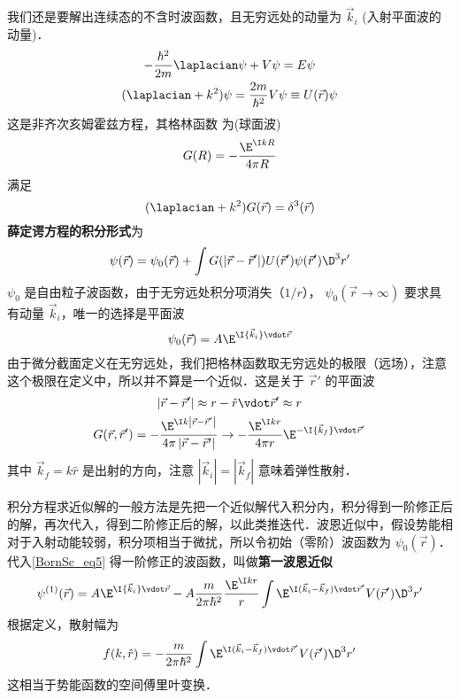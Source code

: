 
我们还是要解出连续态的不含时波函数，且无穷远处的动量为 $\vec k_i$ (入射平面波的动量)．
\begin{gather}
- \frac{{{\hbar ^2}}}{{2m}}{\laplacian}\psi  + V\psi  = E\psi \\
({\laplacian} + {k^2})\psi  = \frac{{2m}}{{{\hbar ^2}}}V\psi  \equiv U(\vec r)\psi
\end{gather}
这是非齐次亥姆霍兹方程，其格林函数%
为(球面波)
\begin{equation}
G(R) =  - \frac{{{\E^{\I kR}}}}{{4\pi R}}
\end{equation}
满足
\begin{equation}
({\laplacian} + {k^2})G(\vec r) = {\delta ^3}(\vec r)
\end{equation}
\textbf{薛定谔方程的积分形式}为
\begin{equation}\label{BornSc_eq5}
\psi (\vec r) = {\psi _0}(\vec r) + \int {G(\left| {\vec r - \vec r'} \right|)U(\vec r')\psi (\vec r'){\D ^3}r'} 
\end{equation}
$\psi_0$ 是自由粒子波函数，由于无穷远处积分项消失（$1/r$）， $\psi_0(\vec r\to\infty)$ 要求具有动量 $\vec k_i$，唯一的选择是平面波
 \begin{equation}
{\psi _0}(\vec r) = A{\E^{\I{{\vec k}_i} \vdot \vec r}}
\end{equation}
由于微分截面定义在无穷远处，我们把格林函数取无穷远处的极限（远场），注意这个极限在定义中，所以并不算是一个近似．这是关于 $\vec r'$ 的平面波
\begin{gather}
\left| {\vec r - \vec r'} \right| \approx r - \hat r \vdot \vec r' \approx r\\
G(\vec r,\vec r') =  - \frac{{{\E^{\I k\left| {\vec r - \vec r'} \right|}}}}{{4\pi \left| {\vec r - \vec r'} \right|}} \to  - \frac{{{\E^{\I kr}}}}{{4\pi r}}{\E^{ -\I {{\vec k}_f} \vdot \vec r'}}
\end{gather}
其中 ${\vec k_f} = k\hat r$ 是出射的方向，注意 $\left| {{{\vec k}_i}} \right| = \left| {{{\vec k}_f}} \right|$ 意味着弹性散射．

积分方程求近似解的一般方法是先把一个近似解代入积分内，积分得到一阶修正后的解，再次代入，得到二阶修正后的解，以此类推迭代．波恩近似中，假设势能相对于入射动能较弱，积分项相当于微扰，所以令初始（零阶）波函数为 $\psi_0(\vec r)$．代入\autoref{BornSc_eq5} 得一阶修正的波函数，叫做\textbf{第一波恩近似}
\begin{equation}
{\psi ^{(1)}}(\vec r) = A{\E^{\I{{\vec k}_i} \vdot \vec r}} - A\frac{m}{{2\pi {\hbar ^2}}}\frac{{{\E^{\I kr}}}}{r}\int {{\E^{\I ({{\vec k}_i} - {{\vec k}_f}) \vdot \vec r'}}V(\vec r'){\D ^3}r'} 
\end{equation}
根据定义，散射幅为
\begin{equation}
f(k,\hat r) =  - \frac{m}{{2\pi {\hbar ^2}}}\int {{\E^{\I ({{\vec k}_i} - {{\vec k}_f}) \vdot \vec r'}}V(\vec r'){\D ^3}r'}
\end{equation}
这相当于势能函数的空间傅里叶变换．

